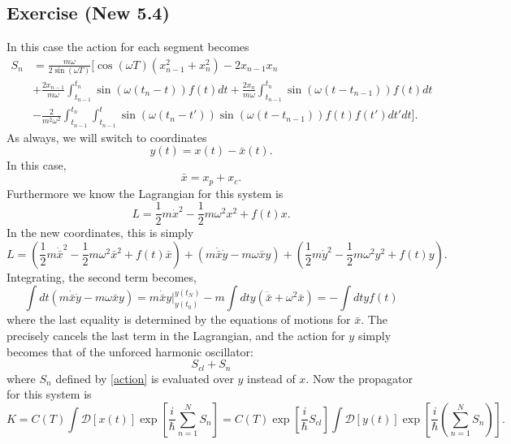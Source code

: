 \subsection{Exercise (New 5.4)}
In this case the action for each segment becomes
\begin{align} \label{beq6}
    S_n&=\frac{m\omega}{2\sin(\omega T)}[\cos(\omega T)(x_{n-1}^2+x_n^2)-2x_{n-1}x_n\\&+\frac{2x_{n-1}}{m\omega}\int_{t_{n-1}}^{t_n}\sin(\omega(t_n-t))f(t)dt+\frac{2x_n}{m\omega}\int_{t_{n-1}}^{t_n}\sin(\omega(t-t_{n-1}))f(t)dt \nonumber\\&-\frac 2 {m^2\omega^2}\int_{t_{n-1}}^{t_n}\int_{t_{n-1}}^{t}\sin(\omega(t_n-t'))\sin(\omega(t-t_{n-1}))f(t)f(t')dt'dt].\nonumber
\end{align}
As always, we will switch to coordinates 
\begin{equation}
    y(t)=x(t)-\bar x(t).
\end{equation}
In this case, 
\begin{equation}
    \bar x = x_p+x_c.
\end{equation}
Furthermore we know the Lagrangian for this system is 
\begin{equation}
    L=\frac 1 2 m \dot x^2-\frac 1 2 m\omega^2 x^2+f(t)x.
\end{equation}
In the new coordinates, this is simply
\begin{equation}
    L=(\frac 1 2 m \dot{\bar x}^2-\frac 1 2 m\omega^2 \bar x^2+f(t)\bar x)+(m\dot{\bar x}\dot y -m \omega \bar x y)+(\frac 1 2 m \dot y ^2 -\frac 1 2 m \omega^2y^2+f(t)y).
\end{equation}
Integrating, the second term becomes, 
\begin{equation}
    \int dt( m\dot{\bar x}\dot y -m \omega \bar x y) = m\dot{\bar x} y |_{y(t_0)}^{y(t_N)}-m\int dt y(\ddot{\bar x}+\omega^2 \bar x)=-\int dt y f(t)
\end{equation}
where the last equality is determined by the equations of motions for $\bar x$. The precisely cancels the last term in the Lagrangian, and the action for $y$ simply becomes that of the unforced harmonic oscillator:
\begin{equation}
    S_{cl}+S_n
\end{equation}
where $S_n$ defined by \eqref{action} is evaluated over $y$ instead of $x$. Now the propagator for this system is 
\begin{equation}
    K=C(T)\int \mathcal D[x(t)]\exp[\frac i \hbar \sum_{n=1}^N S_n]=C(T)\exp[\frac i \hbar S_{cl}]\int \mathcal D[y(t)]\exp[\frac i \hbar (\sum_{n=1}^N S_n)].
\end{equation}
